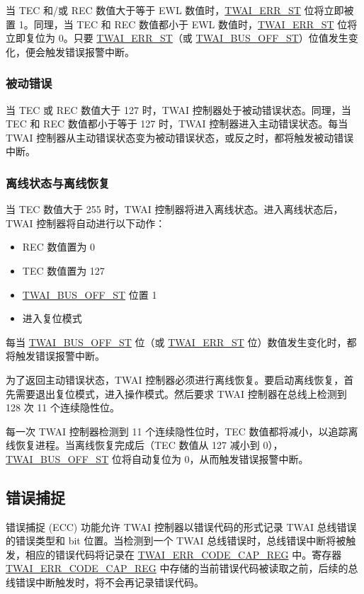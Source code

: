 \documentclass[main\_\_CN.tex]{subfiles}
\begin{document}
当 TEC 和/或 REC 数值大于等于 EWL 数值时，\hyperref[fielddesc:TWAIERRST]{TWAI\_ERR\_ST} 位将立即被置 1。同理，当 TEC 和 REC 数值都小于 EWL 数值时，\hyperref[fielddesc:TWAIERRST]{TWAI\_ERR\_ST} 位将立即复位为 0。只要 \hyperref[fielddesc:TWAIERRST]{TWAI\_ERR\_ST}（或 \hyperref[fielddesc:TWAIBUSOFFST]{TWAI\_BUS\_OFF\_ST}）位值发生变化，便会触发错误报警中断。

\subsubsection{被动错误}

当 TEC 或 REC 数值大于 127 时，TWAI 控制器处于被动错误状态。同理，当 TEC 和 REC 数值都小于等于 127 时，TWAI 控制器进入主动错误状态。每当 TWAI 控制器从主动错误状态变为被动错误状态，或反之时，都将触发被动错误中断。

\subsubsection{离线状态与离线恢复}

当 TEC 数值大于 255 时，TWAI 控制器将进入离线状态。进入离线状态后，TWAI 控制器将自动进行以下动作：

\begin{itemize}
    \item REC 数值置为 0
    \item TEC 数值置为 127
    \item \hyperref[fielddesc:TWAIBUSOFFST]{TWAI\_BUS\_OFF\_ST} 位置 1
    \item 进入复位模式
\end{itemize}

每当 \hyperref[fielddesc:TWAIBUSOFFST]{TWAI\_BUS\_OFF\_ST} 位（或 \hyperref[fielddesc:TWAIERRST]{TWAI\_ERR\_ST} 位）数值发生变化时，都将触发错误报警中断。

为了返回主动错误状态，TWAI 控制器必须进行离线恢复。要启动离线恢复，首先需要退出复位模式，进入操作模式。然后要求 TWAI 控制器在总线上检测到 128 次 11 个连续隐性位。

每一次 TWAI 控制器检测到 11 个连续隐性位时，TEC 数值都将减小，以追踪离线恢复进程。当离线恢复完成后（TEC 数值从 127 减小到 0），\hyperref[fielddesc:TWAIBUSOFFST]{TWAI\_BUS\_OFF\_ST} 位将自动复位为 0，从而触发错误报警中断。

\subsection{错误捕捉}

错误捕捉 (ECC) 功能允许 TWAI 控制器以错误代码的形式记录 TWAI 总线错误的错误类型和 bit 位置。当检测到一个 TWAI 总线错误时，总线错误中断将被触发，相应的错误代码将记录在 \hyperref[regdesc:TWAIERRCODECAPREG]{TWAI\_ERR\_CODE\_CAP\_REG} 中。寄存器 \hyperref[regdesc:TWAIERRCODECAPREG]{TWAI\_ERR\_CODE\_CAP\_REG} 中存储的当前错误代码被读取之前，后续的总线错误中断触发时，将不会再记录错误代码。
\end{document}
